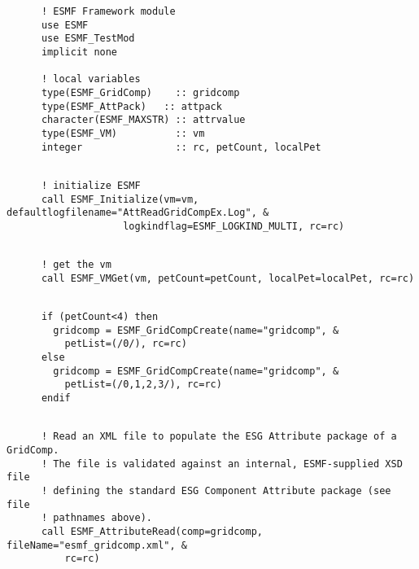  \begin{verbatim}
      ! ESMF Framework module
      use ESMF
      use ESMF_TestMod
      implicit none

      ! local variables
      type(ESMF_GridComp)    :: gridcomp
      type(ESMF_AttPack)   :: attpack
      character(ESMF_MAXSTR) :: attrvalue
      type(ESMF_VM)          :: vm
      integer                :: rc, petCount, localPet
 
\end{verbatim}
 

 \begin{verbatim}
      ! initialize ESMF
      call ESMF_Initialize(vm=vm, defaultlogfilename="AttReadGridCompEx.Log", &
                    logkindflag=ESMF_LOGKIND_MULTI, rc=rc)
 
\end{verbatim}
 

 \begin{verbatim}
      ! get the vm
      call ESMF_VMGet(vm, petCount=petCount, localPet=localPet, rc=rc)
 
\end{verbatim}
 

 \begin{verbatim}
      if (petCount<4) then
        gridcomp = ESMF_GridCompCreate(name="gridcomp", &
          petList=(/0/), rc=rc)
      else
        gridcomp = ESMF_GridCompCreate(name="gridcomp", &
          petList=(/0,1,2,3/), rc=rc)
      endif
 
\end{verbatim}
 

 \begin{verbatim}
      ! Read an XML file to populate the ESG Attribute package of a GridComp.
      ! The file is validated against an internal, ESMF-supplied XSD file
      ! defining the standard ESG Component Attribute package (see file
      ! pathnames above).
      call ESMF_AttributeRead(comp=gridcomp, fileName="esmf_gridcomp.xml", &
          rc=rc)
 
\end{verbatim}
 

